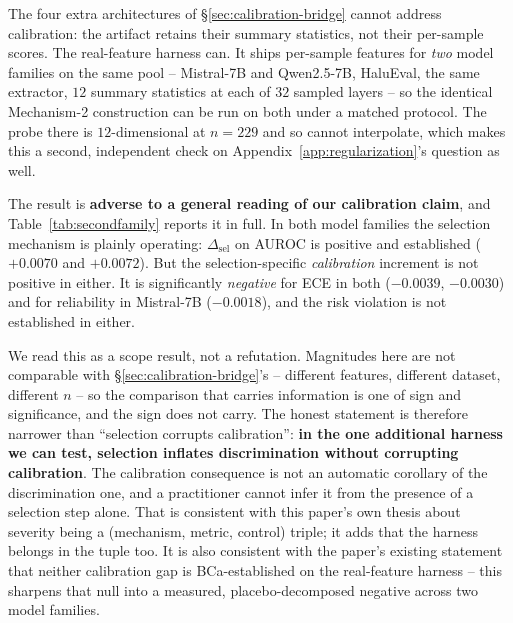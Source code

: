 \documentclass{article}
\begin{document}
The four extra architectures of \S\ref{sec:calibration-bridge} cannot address
calibration: the artifact retains their summary statistics, not their
per-sample scores. The real-feature harness can. It ships per-sample features
for \emph{two} model families on the same pool -- Mistral-7B and Qwen2.5-7B,
HaluEval, the same extractor, $12$ summary statistics at each of $32$ sampled
layers -- so the identical Mechanism-2 construction can be run on both under a
matched protocol. The probe there is $12$-dimensional at $n{=}229$ and so
cannot interpolate, which makes this a second, independent check on
Appendix~\ref{app:regularization}'s question as well.

The result is \textbf{adverse to a general reading of our calibration claim},
and Table~\ref{tab:secondfamily} reports it in full. In both model families the
selection mechanism is plainly operating: $\Delta_{\text{sel}}$ on AUROC is
positive and established ($+0.0070$ and $+0.0072$). But the selection-specific
\emph{calibration} increment is not positive in either. It is significantly
\emph{negative} for ECE in both ($-0.0039$, $-0.0030$) and for reliability in
Mistral-7B ($-0.0018$), and the risk violation is not established in either.

We read this as a scope result, not a refutation. Magnitudes here are not
comparable with \S\ref{sec:calibration-bridge}'s -- different features,
different dataset, different $n$ -- so the comparison that carries information
is one of sign and significance, and the sign does not carry. The honest
statement is therefore narrower than ``selection corrupts calibration'':
\textbf{in the one additional harness we can test, selection inflates
discrimination without corrupting calibration}. The calibration consequence is
not an automatic corollary of the discrimination one, and a practitioner cannot
infer it from the presence of a selection step alone. That is consistent with
this paper's own thesis about severity being a (mechanism, metric, control)
triple; it adds that the harness belongs in the tuple too. It is also
consistent with the paper's existing statement that neither calibration gap is
BCa-established on the real-feature harness -- this sharpens that null into a
measured, placebo-decomposed negative across two model families.
\end{document}

